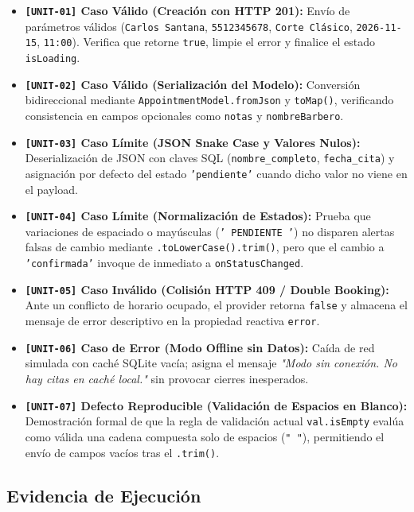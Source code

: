 \documentclass[11pt,a4paper]{article}
\begin{document}
\begin{itemize}
    \item \textbf{\texttt{[UNIT-01]} Caso Válido (Creación con HTTP 201):} Envío de parámetros válidos (\texttt{Carlos Santana}, \texttt{5512345678}, \texttt{Corte Clásico}, \texttt{2026-11-15}, \texttt{11:00}). Verifica que retorne \texttt{true}, limpie el error y finalice el estado \texttt{isLoading}.
    \item \textbf{\texttt{[UNIT-02]} Caso Válido (Serialización del Modelo):} Conversión bidireccional mediante \texttt{AppointmentModel.fromJson} y \texttt{toMap()}, verificando consistencia en campos opcionales como \texttt{notas} y \texttt{nombreBarbero}.
    \item \textbf{\texttt{[UNIT-03]} Caso Límite (JSON Snake Case y Valores Nulos):} Deserialización de JSON con claves SQL (\texttt{nombre\_completo}, \texttt{fecha\_cita}) y asignación por defecto del estado \texttt{'pendiente'} cuando dicho valor no viene en el payload.
    \item \textbf{\texttt{[UNIT-04]} Caso Límite (Normalización de Estados):} Prueba que variaciones de espaciado o mayúsculas (\texttt{' PENDIENTE '}) no disparen alertas falsas de cambio mediante \texttt{.toLowerCase().trim()}, pero que el cambio a \texttt{'confirmada'} invoque de inmediato a \texttt{onStatusChanged}.
    \item \textbf{\texttt{[UNIT-05]} Caso Inválido (Colisión HTTP 409 / Double Booking):} Ante un conflicto de horario ocupado, el provider retorna \texttt{false} y almacena el mensaje de error descriptivo en la propiedad reactiva \texttt{error}.
    \item \textbf{\texttt{[UNIT-06]} Caso de Error (Modo Offline sin Datos):} Caída de red simulada con caché SQLite vacía; asigna el mensaje \textit{"Modo sin conexión. No hay citas en caché local."} sin provocar cierres inesperados.
    \item \textbf{\texttt{[UNIT-07]} Defecto Reproducible (Validación de Espacios en Blanco):} Demostración formal de que la regla de validación actual \texttt{val.isEmpty} evalúa como válida una cadena compuesta solo de espacios (\texttt{"     "}), permitiendo el envío de campos vacíos tras el \texttt{.trim()}.
\end{itemize}

\subsection{Evidencia de Ejecución}
\end{document}
